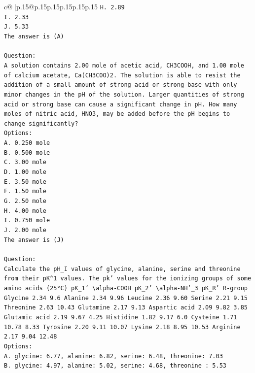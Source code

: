 \documentclass{article}
\begin{document}
{\begin{supertabular}{c@{$\;$}|p{.15\linewidth}@{}p{.15\linewidth}p{.15\linewidth}p{.15\linewidth}p{.15\linewidth}p{.15\linewidth}}
{{{\texttt{H. 2.89} \\
\texttt{I. 2.33} \\
\texttt{J. 5.33} \\
\texttt{The answer is (A)} \\
\\ 
\texttt{Question:} \\
\texttt{A solution contains 2.00 mole of acetic acid, CH3COOH, and 1.00 mole of calcium acetate, Ca(CH3COO)2. The solution is able to resist the addition of a small amount of strong acid or strong base with only minor changes in the pH of the solution. Larger quantities of strong acid or strong base can cause a significant change in pH. How many moles of nitric acid, HNO3, may be added before the pH begins to change significantly?} \\
\texttt{Options:} \\
\texttt{A. 0.250 mole} \\
\texttt{B. 0.500 mole} \\
\texttt{C. 3.00 mole} \\
\texttt{D. 1.00 mole} \\
\texttt{E. 3.50 mole} \\
\texttt{F. 1.50 mole} \\
\texttt{G. 2.50 mole} \\
\texttt{H. 4.00 mole} \\
\texttt{I. 0.750 mole} \\
\texttt{J. 2.00 mole} \\
\texttt{The answer is (J)} \\
\\ 
\texttt{Question:} \\
\texttt{Calculate the pH\_I values of glycine, alanine, serine and threonine from their pK\^{}1 values. The pk' values for the ionizing groups of some amino acids (25°C) pK\_1' \textbackslash{}alpha{-}COOH pK\_2' \textbackslash{}alpha{-}NH'\_3 pK\_R' R{-}group Glycine 2.34 9.6 Alanine 2.34 9.96 Leucine 2.36 9.60 Serine 2.21 9.15 Threonine 2.63 10.43 Glutamine 2.17 9.13 Aspartic acid 2.09 9.82 3.85 Glutamic acid 2.19 9.67 4.25 Histidine 1.82 9.17 6.0 Cysteine 1.71 10.78 8.33 Tyrosine 2.20 9.11 10.07 Lysine 2.18 8.95 10.53 Arginine 2.17 9.04 12.48} \\
\texttt{Options:} \\
\texttt{A. glycine: 6.77, alanine: 6.82, serine: 6.48, threonine: 7.03} \\
\texttt{B. glycine: 4.97, alanine: 5.02, serine: 4.68, threonine : 5.53} \\
}}}
\end{supertabular}}
\end{document}
